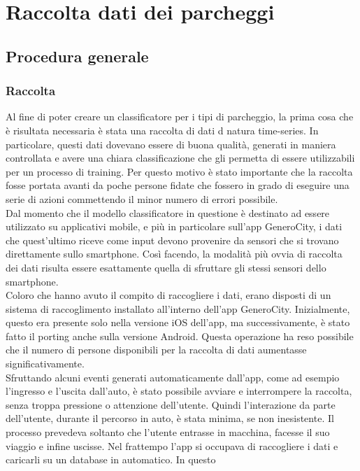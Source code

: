 \chapter{Raccolta dati dei parcheggi}
\section{Procedura generale} 

\subsection{Raccolta}
Al fine di poter creare un classificatore per i tipi di parcheggio, la prima cosa
che è risultata necessaria è stata una raccolta di dati d natura time-series. In particolare, questi dati
dovevano essere di buona qualità, generati in maniera controllata e avere una chiara
classificazione che gli permetta di essere utilizzabili per un processo di training. 
Per questo motivo è stato importante che la raccolta fosse portata
avanti da poche persone fidate che fossero in grado di eseguire una serie di azioni
commettendo il minor numero di errori possibile.\\
Dal momento che il modello classificatore in questione è destinato ad essere utilizzato
su applicativi mobile, e più in particolare sull'app GeneroCity, i dati che quest'ultimo
riceve come input devono provenire da sensori che si trovano direttamente sullo smartphone.
Così facendo, la modalità più ovvia di raccolta dei dati risulta essere esattamente 
quella di sfruttare gli stessi sensori dello smartphone.\\
Coloro che hanno avuto il compito di raccogliere i dati, erano disposti di un sistema di
raccoglimento installato all'interno dell'app GeneroCity. Inizialmente, questo era presente
solo nella versione iOS dell'app, ma successivamente, è stato fatto il porting anche sulla
versione Android. Questa operazione ha reso possibile che il numero di persone disponibili
per la raccolta di dati aumentasse significativamente.\\
Sfruttando alcuni eventi generati automaticamente dall'app, come ad esempio l'ingresso e
l'uscita dall'auto, è stato possibile avviare e interrompere la raccolta, senza troppa
pressione o attenzione dell'utente. Quindi l'interazione da parte dell'utente,
durante il percorso in auto, è stata minima, se non inesistente. Il processo prevedeva soltanto
che l'utente entrasse in macchina, facesse il suo viaggio e infine uscisse. Nel frattempo 
l'app si occupava di raccogliere i dati e caricarli su un database in automatico. In questo
